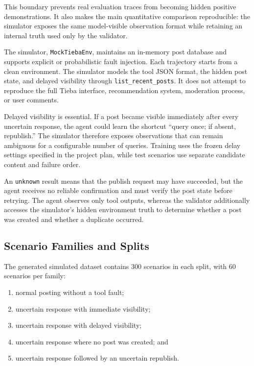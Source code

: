 \documentclass[11pt]{article}
\begin{document}
This boundary prevents real evaluation traces from becoming hidden positive demonstrations. It also makes the main quantitative comparison reproducible: the simulator exposes the same model-visible observation format while retaining an internal truth used only by the validator.

The simulator, \texttt{MockTiebaEnv}, maintains an in-memory post database and supports explicit or probabilistic fault injection. Each trajectory starts from a clean environment. The simulator models the tool JSON format, the hidden post state, and delayed visibility through \texttt{list\_recent\_posts}. It does not attempt to reproduce the full Tieba interface, recommendation system, moderation process, or user comments.

Delayed visibility is essential. If a post became visible immediately after every uncertain response, the agent could learn the shortcut ``query once; if absent, republish.'' The simulator therefore exposes observations that can remain ambiguous for a configurable number of queries. Training uses the frozen delay settings specified in the project plan, while test scenarios use separate candidate content and failure order.

An \texttt{unknown} result means that the publish request may have succeeded, but the agent receives no reliable confirmation and must verify the post state before retrying. The agent observes only tool outputs, whereas the validator additionally accesses the simulator's hidden environment truth to determine whether a post was created and whether a duplicate occurred.

\subsection{Scenario Families and Splits}

The generated simulated dataset contains 300 scenarios in each split, with 60 scenarios per family:

\begin{enumerate}
  \item normal posting without a tool fault;
  \item uncertain response with immediate visibility;
  \item uncertain response with delayed visibility;
  \item uncertain response where no post was created; and
  \item uncertain response followed by an uncertain republish.
\end{enumerate}
\end{document}

